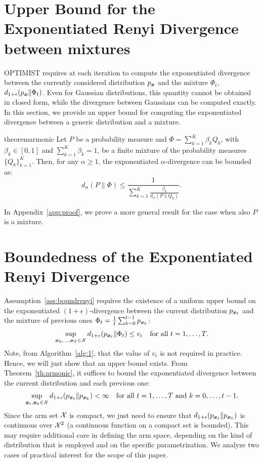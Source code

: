 \documentclass{article}
\makeatletter
\DeclareRobustCommand{\algoname}{OPTIMIST\@\xspace}
\makeatother
\begin{document}
\section{Upper Bound for the Exponentiated Renyi Divergence between mixtures}\label{app:practical}
\algoname requires at each iteration to compute the exponentiated \Renyi divergence between the currently considered distribution $p_{\boldsymbol{x}}$ 
and the mixture $\Phi_t$, \ie $d_{1+\epsilon}(p_{\boldsymbol{x}}\|\Phi_t)$. Even for Gaussian distributions, this quantity cannot be obtained in closed form, while
the \Renyi divergence between Gaussians can be computed exactly. In this section, we provide an upper bound for computing the exponentiated \Renyi divergence
between a generic distribution and a mixture.
\begin{restatable}{theorem}{armonic}\label{th:armonic}
	Let $P$ be a probability measure and $\Phi = \sum_{k=1}^K \beta_k Q_k$, with $\beta_k \in [0,1]$ and $\sum_{k=1}^K \beta_k =1$, be a finite mixture of the
	probability measures $\{Q_k\}_{k=1}^K$. Then, for any $\alpha \ge 1$, the exponentiated $\alpha$-\Renyi divergence can be bounded as: 
	\begin{equation*}
	d_{\alpha}(P \| \Phi) \le \frac{1} {\sum_{k=1}^K \frac{ \beta_k}{ d_{\alpha}(P \| Q_k)}}.
	\end{equation*}
\end{restatable}

In Appendix~\ref{app:proof}, we prove a more general result for the case when also $P$ is a mixture.

\section{Boundedness of the Exponentiated Renyi Divergence}\label{app:renyi}
Assumption~\ref{ass:boundrenyi} requires the existence of a uniform upper bound on the exponentiated $(1+\epsilon)$-\Renyi divergence between the current distribution $p_{\boldsymbol{x}_t}$ and the mixture of previous ones $\Phi_t=\frac{1}{t}\sum_{k=0}^{t-1}p_{\boldsymbol{x}_k}$:
\begin{align*}
&\sup_{\boldsymbol{x}_0,\dots,\boldsymbol{x}_T\in\mathcal{X}}d_{1+\epsilon}(p_{\boldsymbol{x}_t}\|\Phi_t) \leq v_{\epsilon} &\text{for all $t=1,\dots,T$}.
\end{align*}
Note, from Algorithm~\ref{alg:1}, that the value of $v_{\epsilon}$ is not required in practice. Hence, we will just show that an upper bound exists.
From Theorem~\ref{th:armonic}, it suffices to bound the exponentiated \Renyi divergence between the current distribution and each previous one:
\begin{align}
	&\sup_{\boldsymbol{x}_t, \boldsymbol{x}_k\in\mathcal{X}}d_{1+\epsilon}(p_{\boldsymbol{x}_t}\|p_{\boldsymbol{x}_k}) < \infty &\text{for all $t=1,\dots,T$ and $k=0,\dots,t-1$.}
\end{align}
Since the arm set $\mathcal{X}$ is compact, we just need to ensure that $d_{1+\epsilon}(p_{\boldsymbol{x}_t}\|p_{\boldsymbol{x}_k})$ is continuous over $\mathcal{X}^2$ (a continuous function on a compact set is bounded).  This may require additional care in defining the arm space, depending on the kind of distribution that is employed and on the specific parametrization. We analyze two cases of practical interest for the scope of this paper.
\end{document}
